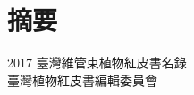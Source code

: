\thispagestyle{empty}
\chapter*{\hspace{9.5em}摘\hspace{2em}要\hspace{10em}}
\linespread{1.5}\selectfont

\huge 2017 臺灣維管束植物紅皮書名錄 \\
\noindent \Large 臺灣植物紅皮書編輯委員會
\hspace{2em}\\
\\
\normalsize
\\

